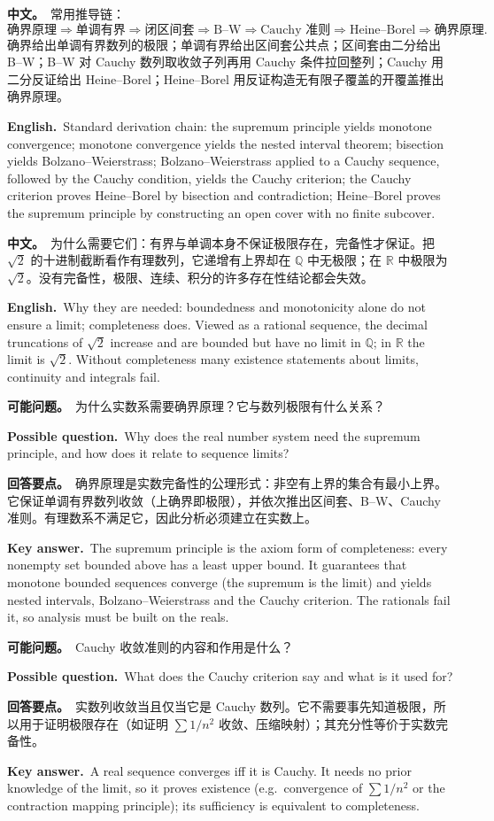 \documentclass[UTF8,11pt,a4paper]{ctexart}
\newcommand{\R}{\mathbb{R}}
\newcommand{\Q}{\mathbb{Q}}
\newcommand{\BOTH}[2]{\par\noindent\textbf{中文。}\ #1\par\noindent\textbf{English.}\ #2\par}
\newcommand{\ASK}[4]{\begin{samepage}\par\noindent\textbf{可能问题。}\ #1\par\noindent\textbf{Possible question.}\ #2\par\noindent\textbf{回答要点。}\ #3\par\noindent\textbf{Key answer.}\ #4\medskip\end{samepage}}
\begin{document}
\BOTH{常用推导链：
\[
\text{确界原理}\Rightarrow\text{单调有界}\Rightarrow\text{闭区间套}\Rightarrow\text{B--W}\Rightarrow\text{Cauchy 准则}\Rightarrow\text{Heine--Borel}\Rightarrow\text{确界原理}.
\]
确界给出单调有界数列的极限；单调有界给出区间套公共点；区间套由二分给出 B--W；B--W 对 Cauchy 数列取收敛子列再用 Cauchy 条件拉回整列；Cauchy 用二分反证给出 Heine--Borel；Heine--Borel 用反证构造无有限子覆盖的开覆盖推出确界原理。}{Standard derivation chain: the supremum principle yields monotone convergence; monotone convergence yields the nested interval theorem; bisection yields Bolzano--Weierstrass; Bolzano--Weierstrass applied to a Cauchy sequence, followed by the Cauchy condition, yields the Cauchy criterion; the Cauchy criterion proves Heine--Borel by bisection and contradiction; Heine--Borel proves the supremum principle by constructing an open cover with no finite subcover.}
\BOTH{为什么需要它们：有界与单调本身不保证极限存在，完备性才保证。把 $\sqrt2$ 的十进制截断看作有理数列，它递增有上界却在 $\Q$ 中无极限；在 $\R$ 中极限为 $\sqrt2$。没有完备性，极限、连续、积分的许多存在性结论都会失效。}{Why they are needed: boundedness and monotonicity alone do not ensure a limit; completeness does. Viewed as a rational sequence, the decimal truncations of $\sqrt2$ increase and are bounded but have no limit in $\Q$; in $\R$ the limit is $\sqrt2$. Without completeness many existence statements about limits, continuity and integrals fail.}
\ASK{为什么实数系需要确界原理？它与数列极限有什么关系？}{Why does the real number system need the supremum principle, and how does it relate to sequence limits?}{确界原理是实数完备性的公理形式：非空有上界的集合有最小上界。它保证单调有界数列收敛（上确界即极限），并依次推出区间套、B--W、Cauchy 准则。有理数系不满足它，因此分析必须建立在实数上。}{The supremum principle is the axiom form of completeness: every nonempty set bounded above has a least upper bound. It guarantees that monotone bounded sequences converge (the supremum is the limit) and yields nested intervals, Bolzano--Weierstrass and the Cauchy criterion. The rationals fail it, so analysis must be built on the reals.}
\ASK{Cauchy 收敛准则的内容和作用是什么？}{What does the Cauchy criterion say and what is it used for?}{实数列收敛当且仅当它是 Cauchy 数列。它不需要事先知道极限，所以用于证明极限存在（如证明 $\sum1/n^2$ 收敛、压缩映射）；其充分性等价于实数完备性。}{A real sequence converges iff it is Cauchy. It needs no prior knowledge of the limit, so it proves existence (e.g.\ convergence of $\sum1/n^2$ or the contraction mapping principle); its sufficiency is equivalent to completeness.}
\end{document}
